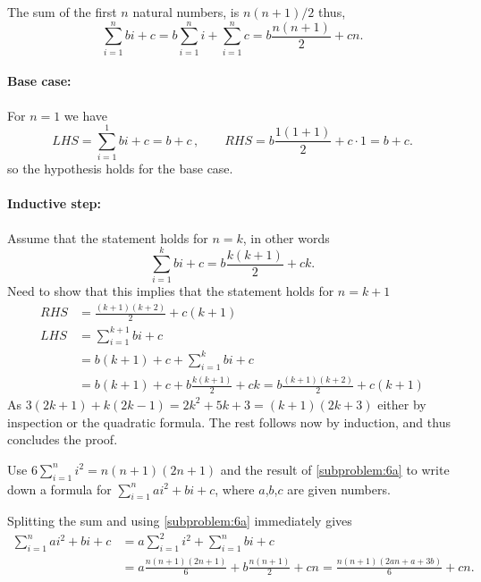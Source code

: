 \documentclass[a4paper, english, 12pt]{article} %
\begin{document}
\begin{answer}
  The sum of the first $n$ natural numbers, is $n(n+1)/2$ thus,
  \begin{equation*}
    \sum_{i=1}^{n} bi + c
    = b \sum_{i=1}^{n} i + \sum_{i=1}^n c
    = b \frac{n(n+1)}{2} + cn.
  \end{equation*}
  \paragraph{Base case:} For $n = 1$ we have
  \begin{equation*}
    LHS = \sum_{i=1}^1 bi + c = b + c\,, \qquad
    RHS = b \frac{1(1+1)}{2} + c \cdot 1 = b + c.
  \end{equation*}
  so the hypothesis holds for the base case.
  \paragraph{Inductive step:} Assume that the statement holds for $n=k$, in
  other words
  \begin{equation*}
    \sum_{i=1}^{k} bi + c
    = b \frac{k(k+1)}{2} + ck.
  \end{equation*}
  Need to show that this implies that the statement holds for $n=k+1$
  \begin{align*}
    RHS & = \frac{(k+1)(k+2)}{2} + c(k+1) \\
    LHS & = \sum_{i=1}^{k+1} bi + c \\
        & = b (k+1) + c + \sum_{i=1}^k bi + c \\
        & = b (k+1) + c + b\frac{k(k+1)}{2} + ck  
          =  b \frac{(k+1)(k+2)}{2} + c(k+1)
  \end{align*}
  As $3(2k+1) + k(2k-1) = 2k^2 + 5k + 3 = (k+1)(2k+3)$ either by inspection or
  the quadratic formula. The rest follows now by induction, and thus concludes
  the proof.
\end{answer}

\begin{subproblem}
  Use $6 \sum_{i=1}^n i^2 = n(n+1)(2n+1)$ and the result of \cref{subproblem:6a}
  to write down a formula for $\sum_{i=1}^n ai^2 + bi + c$, where $a$,$b$,$c$
  are given numbers.
\end{subproblem}

\begin{answer}
  Splitting the sum and using \cref{subproblem:6a} immediately gives
  \begin{align*}
          \sum_{i=1}^n ai^2 + bi + c
    & = a \sum_{i=1}^2i^2 + \sum_{i=1}^n bi + c \\
    & = a \frac{n(n+1)(2n+1)}{6} + b \frac{n(n+1)}{2} + cn
      =   \frac{n(n+1)(2an + a + 3b)}{6} + cn.
  \end{align*} 
\end{answer}
\end{document}
